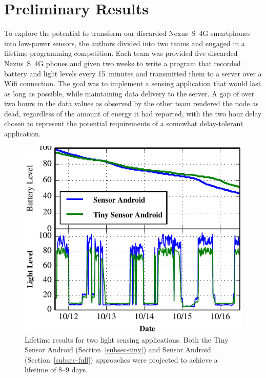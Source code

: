 \section{Preliminary Results}
\label{sec-results}

To explore the potential to transform our discarded Nexus~S~4G smartphones
into low-power sensors, the authors divided into two teams and engaged in a
lifetime programming competition. Each team was provided five discarded
Nexus~S~4G phones and given two weeks to write a program that recorded
battery and light levels every 15~minutes and transmitted them to a server
over a Wifi connection. The goal was to implement a sensing application that
would last as long as possible, while maintaining data delivery to the
server. A gap of over two hours in the data values as observed by the other
team rendered the node as dead, regardless of the amount of energy it had
reported, with the two hour delay chosen to represent the potential
requirements of a somewhat delay-tolerant application.

\begin{figure}[t]
\includegraphics[width=\columnwidth]{./figures/comparison.pdf}

\caption{\small Lifetime results for two light sensing applications.
\textnormal{Both the Tiny Sensor Android (Section~\ref{subsec-tiny}) and
Sensor Android (Section~\ref{subsec-full}) approaches were projected to
achieve a lifetime of 8--9 days.}}

\label{fig-comparison}
\end{figure}


